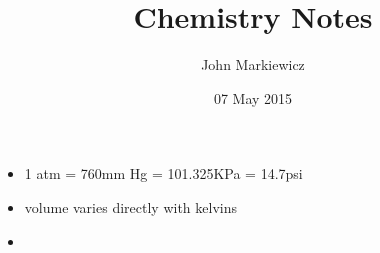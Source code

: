 \documentclass[11pt]{article}
\begin{document}
\title{Chemistry Notes}
\author{John Markiewicz}
\date{07 May 2015}
\maketitle
\begin{itemize}
	\item 1 atm = 760mm Hg = 101.325KPa = 14.7psi
	\item volume varies directly with kelvins
	\item 
\end{itemize}
\end{document}
